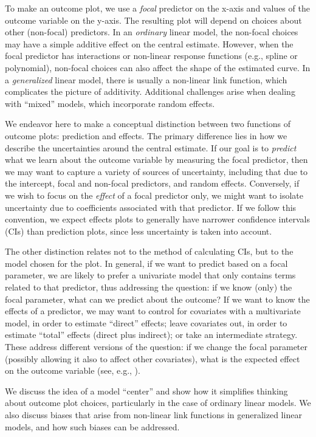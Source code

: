To make an outcome plot, we use a \emph{focal} predictor on the x-axis and values of the outcome variable on the y-axis. The resulting plot will depend on choices about other (non-focal) predictors. In an \emph{ordinary} linear model, the non-focal choices may have a simple additive effect on the central estimate. However, when the focal predictor has interactions or non-linear response functions (e.g., spline or polynomial), non-focal choices can also affect the shape of the estimated curve. 
In a \emph{generalized} linear model, there is usually a non-linear link function, which complicates the picture of additivity.
Additional challenges arise when dealing with “mixed” models, which incorporate random effects.

We endeavor here to make a conceptual distinction between two functions of outcome plots: prediction and effects. 
The primary difference lies in how we describe the uncertainties around the central estimate. 
If our goal is to \emph{predict} what we learn about the outcome variable by measuring the focal predictor, then we may want to capture a variety of sources of uncertainty, including that due to the intercept, focal and non-focal predictors, and random effects.
Conversely, if we wish to focus on the \emph{effect} of a focal predictor only, we might want to isolate uncertainty due to coefficients associated with that predictor.
If we follow this convention, we expect effects plots to generally have narrower confidence intervals (CIs) than prediction plots, since less uncertainty is taken into account.

The other distinction relates not to the method of calculating CIs, but to the model chosen for the plot. 
In general, if we want to predict based on a focal parameter, we are likely to prefer a univariate model that only contains terms related to that predictor, thus addressing the question: if we know (only) the focal parameter, what can we predict about the outcome?
If we want to know the effects of a predictor, we may want to control for covariates with a multivariate model, in order to estimate “direct” effects; leave covariates out, in order to estimate “total” effects (direct plus indirect); or take an intermediate strategy.
These address different versions of the question: if we change the focal parameter (possibly allowing it also to affect other covariates), what is the expected effect on the outcome variable (see, e.g., \citep{shi_evidence_2017}).

We discuss the idea of a model “center” and show how it simplifies thinking about outcome plot choices, particularly in the case of ordinary linear models. We also discuss biases that arise from non-linear link functions in generalized linear models, and how such biases can be addressed.

